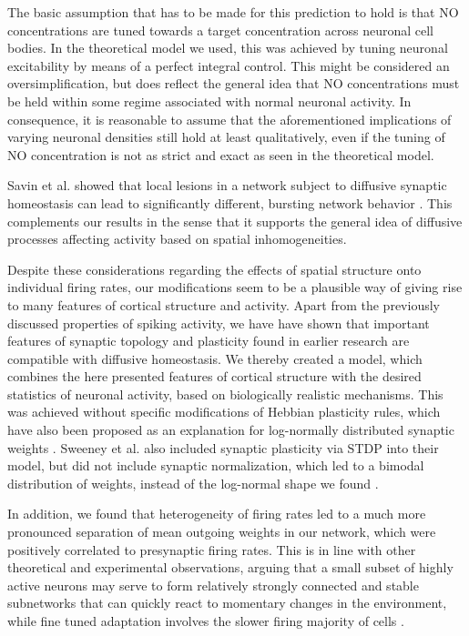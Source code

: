 \documentclass[10pt,letterpaper]{article}
\begin{document}
The basic assumption that has to be made for this prediction to hold is that NO concentrations are tuned towards a target concentration across neuronal cell bodies. In the theoretical model we used, this was achieved by tuning neuronal excitability by means of a perfect integral control. This might be considered an oversimplification, but does reflect the general idea that NO concentrations must be held within some regime associated with normal neuronal activity. In consequence, it is reasonable to assume that the aforementioned implications of varying neuronal densities still hold at least qualitatively, even if the tuning of NO concentration is not as strict and exact as seen in the theoretical model.

Savin et al. showed that local lesions in a network subject to diffusive synaptic homeostasis can lead to significantly different, bursting network behavior \cite{Savin_2008}. This complements our results in the sense that it supports the general idea of diffusive processes affecting activity based on spatial inhomogeneities.

Despite these considerations regarding the effects of spatial structure onto individual firing rates, our modifications seem to be a plausible way of giving rise to many features of cortical structure and activity. Apart from the previously discussed properties of spiking activity, we have have shown that important features of synaptic topology and plasticity found in earlier research are compatible with diffusive homeostasis. We thereby created a model, which combines the here presented features of cortical structure with the desired statistics of neuronal activity, based on biologically realistic mechanisms. This was achieved without specific modifications of Hebbian plasticity rules, which have also been proposed as an explanation for log-normally distributed synaptic weights \cite{Koulakov_2009,Gilson_2011,Effenberger_2015}. Sweeney et al. also included synaptic plasticity via STDP into their model, but did not include synaptic normalization, which led to a bimodal distribution of weights, instead of the log-normal shape we found \cite{Sweeney_Paper}.

In addition, we found that heterogeneity of firing rates led to a much more pronounced separation of mean outgoing weights in our network, which were positively correlated to presynaptic firing rates. This is in line with other theoretical and experimental observations, arguing that a small subset of highly active neurons may serve to form relatively strongly connected and stable subnetworks that can quickly react to momentary changes in the environment, while fine tuned adaptation involves the slower firing majority of cells \cite{Buzsaki_Fir_Rates_2014,Yassin_Subnetworks_2010,Dragoi_2003}.
\end{document}
